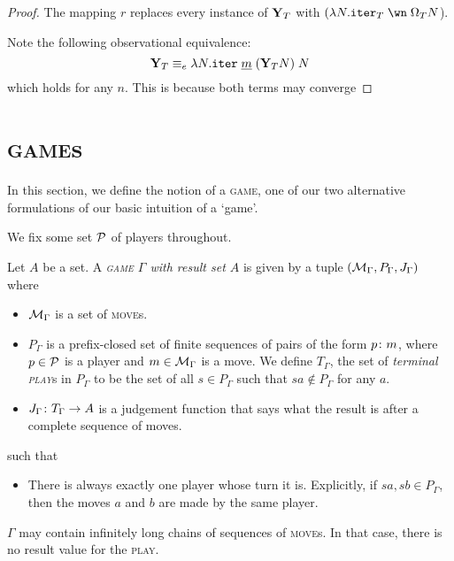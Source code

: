 \documentclass{article}
\newcommand{\game}{\textsc{game}}
\newcommand{\play}{\textsc{play}}
\newcommand{\move}{\textsc{move}}
\begin{document}
\begin{proof}
  The mapping $r$ replaces every instance of $\Y_T$ with $(\lambda N.\iter_T\;\wn\;\Omega_T N$).

  Note the following observational equivalence:
  \[
    \Y_T \equiv_e \lambda N.\iter\;\ul{m}\;(\Y_T N)\;N
    \]
  which holds for any $n$.  
  This is because both terms may converge 
\end{proof}

\section{\game{}s}

In this section, we define the notion of a \game, one of our two alternative formulations of our basic intuition of a `game'.

We fix some set $\P$ of players throughout.

\begin{definition}
  Let $A$ be a set.  
  A \emph{\game{} $\Gamma$ with result set $A$} is given by a tuple $(\M_\Gamma,P_\Gamma,J_\Gamma)$ where
  \begin{itemize}
    \item $\M_\Gamma$ is a set of \move{}s.
    \item $P_\Gamma$ is a prefix-closed set of finite sequences of pairs of the form $p\from m$, where $p\in\P$ is a player and $m\in\M_\Gamma$ is a move.  We define $T_\Gamma$, the set of \emph{terminal \play{}}s in $P_\Gamma$ to be the set of all $s\in P_\Gamma$ such that $sa\not\in P_\Gamma$ for any $a$.  
    \item $J_\Gamma\from T_\Gamma\to A$ is a judgement function that says what the result is after a complete sequence of moves.
  \end{itemize}
  such that
  \begin{itemize}
    \item There is always exactly one player whose turn it is.  
      Explicitly, if $sa,sb\in P_\Gamma$, then the moves $a$ and $b$ are made by the same player.
  \end{itemize}
\end{definition}

\begin{remark}
  $\Gamma$ may contain infinitely long chains of sequences of \move{}s.  
  In that case, there is no result value for the \play{}.
\end{remark}
\end{document}
